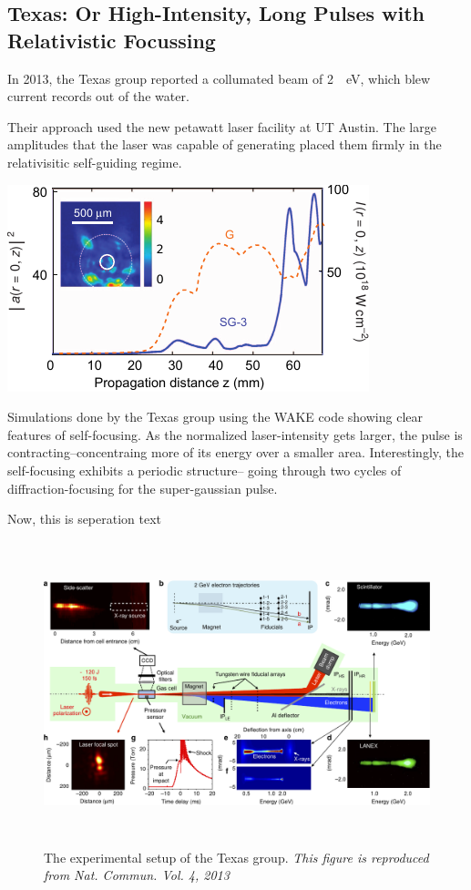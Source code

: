 \documentclass[12pt, titlepage]{article}
\begin{document}
\subsection{Texas: Or High-Intensity, Long Pulses with Relativistic Focussing}

In 2013, the Texas group reported a collumated beam of \SI{2}{\giga
\electronvolt}, which blew current records out of the
water\cite{Wang2013}.

Their approach used the new petawatt laser facility at UT Austin. The large
amplitudes that the laser was capable of generating placed them firmly in the
relativisitic self-guiding regime.
\begin{marginfigure}
	\includegraphics[width=\marginparwidth]{../figures/wakesimulation.pdf}
    \caption{Simulations done by the Texas group using the WAKE
        code showing clear features of self-focusing.\cite{Wang2013} As the
        normalized laser-intensity gets larger, the pulse is
        contracting--concentraing more of its energy over a smaller area.
        Interestingly, the self-focusing exhibits a periodic structure-- going
        through two cycles of diffraction-focusing for the super-gaussian
    pulse.\label{fig:propsim}}
\end{marginfigure}
Now, this is seperation text
\begin{figure}[b!]
    \centering
	\includegraphics[width=500pt,height=250pt]{../figures/texasexplayout.pdf}
    \caption{The experimental setup of the Texas group.\cite{Wang2013} \em{This
    figure is reproduced from Nat. Commun. Vol. 4, 2013}}
\end{figure}
\end{document}
